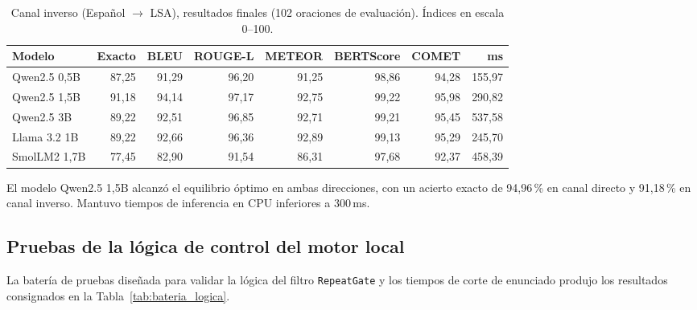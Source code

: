 \begin{table}[H]
\centering
\footnotesize
\caption{Canal inverso (Español $\rightarrow$ LSA), resultados finales (102 oraciones de evaluación). Índices en escala 0--100.}
\label{tab:sem_inverso}
\begin{tabular}{lrrrrrrr}
\toprule
\textbf{Modelo} & \textbf{Exacto} & \textbf{BLEU} & \textbf{ROUGE-L} & \textbf{METEOR} & \textbf{BERTScore} & \textbf{COMET} & \textbf{ms} \\
\midrule
Qwen2.5 0,5B & 87,25 & 91,29 & 96,20 & 91,25 & 98,86 & 94,28 & 155,97 \\
Qwen2.5 1,5B & 91,18 & 94,14 & 97,17 & 92,75 & 99,22 & 95,98 & 290,82 \\
Qwen2.5 3B   & 89,22 & 92,51 & 96,85 & 92,71 & 99,21 & 95,45 & 537,58 \\
Llama 3.2 1B & 89,22 & 92,66 & 96,36 & 92,89 & 99,13 & 95,29 & 245,70 \\
SmolLM2 1,7B & 77,45 & 82,90 & 91,54 & 86,31 & 97,68 & 92,37 & 458,39 \\
\bottomrule
\end{tabular}
\end{table}

El modelo Qwen2.5 1,5B alcanzó el equilibrio óptimo en ambas direcciones, con un acierto exacto de 94,96\,\% en canal directo y 91,18\,\% en canal inverso. Mantuvo tiempos de inferencia en CPU inferiores a 300\,ms.

\subsection{Pruebas de la lógica de control del motor local}
La batería de pruebas diseñada para validar la lógica del filtro \texttt{RepeatGate} y los tiempos de corte de enunciado produjo los resultados consignados en la Tabla~\ref{tab:bateria_logica}.

